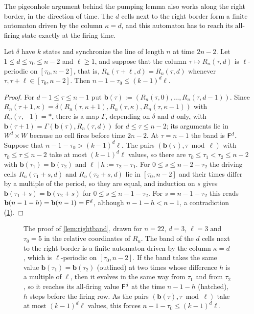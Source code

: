 The pigeonhole argument behind the pumping lemma also works along the right
border, in the direction of time. The $d$ cells next to the right border form a
finite automaton driven by the column $\kappa=d$, and this automaton has to
reach its all-firing state exactly at the firing time.

\begin{lemma}\label{lem:rightband}
Let $\delta$ have $k$ states and synchronize the line of length $n$ at time
$2n-2$. Let $1\le d\le\tau_0\le n-2$ and $\ell\ge1$, and suppose that the
column $\tau\mapsto R_n(\tau,d)$ is $\ell$-periodic on $[\tau_0,n-2]$, that is,
$R_n(\tau+\ell,d)=R_n(\tau,d)$ whenever $\tau,\tau+\ell\in[\tau_0,n-2]$. Then
$n-1-\tau_0\le(k-1)^d\ell$.
\end{lemma}

\begin{proof}
For $d-1\le\tau\le n-1$ put $\mathbf b(\tau):=(R_n(\tau,0),\dots,R_n(\tau,d-1))$.
Since $R_n(\tau+1,\kappa)=\delta(R_n(\tau,\kappa+1),R_n(\tau,\kappa),
R_n(\tau,\kappa-1))$ with $R_n(\tau,-1)=\ast$, there is a map $\Gamma$,
depending on $\delta$ and $d$ only, with $\mathbf b(\tau+1)=\Gamma(\mathbf
b(\tau),R_n(\tau,d))$ for $d\le\tau\le n-2$; its arguments lie in $W^d\times W$
because no cell fires before time $2n-2$. At $\tau=n-1$ the band is $\mathsf F^d$.
Suppose that $n-1-\tau_0>(k-1)^d\ell$. The pairs $(\mathbf
b(\tau),\tau\bmod\ell)$ with $\tau_0\le\tau\le n-2$ take at most $(k-1)^d\ell$
values, so there are $\tau_0\le\tau_1<\tau_2\le n-2$ with $\mathbf
b(\tau_1)=\mathbf b(\tau_2)$ and $\ell\mid h:=\tau_2-\tau_1$. For $0\le s\le
n-2-\tau_2$ the driving cells $R_n(\tau_1+s,d)$ and $R_n(\tau_2+s,d)$ lie in
$[\tau_0,n-2]$ and their times differ by a multiple of the period, so they are
equal, and induction on $s$ gives $\mathbf b(\tau_1+s)=\mathbf b(\tau_2+s)$ for
$0\le s\le n-1-\tau_2$. For $s=n-1-\tau_2$ this reads $\mathbf
b(n-1-h)=\mathbf b(n-1)=\mathsf F^d$, although $n-1-h<n-1$, a contradiction
(\cref{fig:rightband}).
\end{proof}

\begin{figure}[t]
\centering

\caption{The proof of \cref{lem:rightband}, drawn for $n=22$, $d=3$,
$\ell=3$ and $\tau_0=5$ in the relative coordinates of $R_n$. The band of the
$d$ cells next to the right border is a finite automaton driven by the column
$\kappa=d$, which is $\ell$-periodic on $[\tau_0,n-2]$. If the band takes the
same value $\mathbf b(\tau_1)=\mathbf b(\tau_2)$ (outlined) at two times whose
difference $h$ is a multiple of $\ell$, then it evolves in the same way from
$\tau_1$ and from $\tau_2$, so it reaches its all-firing value $\mathsf F^d$ at the
time $n-1-h$ (hatched), $h$ steps before the firing row. As the pairs
$(\mathbf b(\tau),\tau\bmod\ell)$ take at most $(k-1)^d\ell$ values, this
forces $n-1-\tau_0\le(k-1)^d\ell$.}
\label{fig:rightband}
\end{figure}
